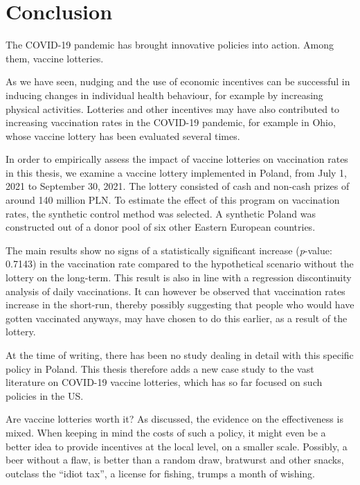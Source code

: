 \documentclass{scrbook}
\begin{document}
\chapter{Conclusion}

The COVID-19 pandemic has brought innovative policies into action. Among
them, vaccine lotteries.

As we have seen, nudging and the use of economic incentives can be
successful in inducing changes in individual health behaviour, for
example by increasing physical activities. Lotteries and other
incentives may have also contributed to increasing vaccination rates in
the COVID-19 pandemic, for example in Ohio, whose vaccine lottery has
been evaluated several times.

In order to empirically assess the impact of vaccine lotteries on
vaccination rates in this thesis, we examine a vaccine lottery
implemented in Poland, from July 1, 2021 to September 30, 2021. The
lottery consisted of cash and non-cash prizes of around 140 million PLN.
To estimate the effect of this program on vaccination rates, the
synthetic control method was selected. A synthetic Poland was
constructed out of a donor pool of six other Eastern European countries.

The main results show no signs of a statistically significant increase
(\textit{p}-value: 0.7143) in the vaccination rate compared to the
hypothetical scenario without the lottery on the long-term. This result
is also in line with a regression discontinuity analysis of daily
vaccinations. It can however be observed that vaccination rates increase
in the short-run, thereby possibly suggesting that people who would have
gotten vaccinated anyways, may have chosen to do this earlier, as a
result of the lottery.

At the time of writing, there has been no study dealing in detail with
this specific policy in Poland. This thesis therefore adds a new case
study to the vast literature on COVID-19 vaccine lotteries, which has so
far focused on such policies in the US.

Are vaccine lotteries worth it? As discussed, the evidence on the
effectiveness is mixed. When keeping in mind the costs of such a policy,
it might even be a better idea to provide incentives at the local level,
on a smaller scale. Possibly, a beer without a flaw, is better than a
random draw, bratwurst and other snacks, outclass the ``idiot tax'', a
license for fishing, trumps a month of wishing.
\end{document}

